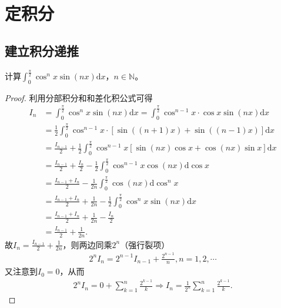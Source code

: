 \documentclass[../../main.tex]{subfiles}%
\begin{document}
\section{定积分}

\subsection{建立积分递推}

\begin{example}
计算\(\int_{0}^{\frac{\pi}{2}} \cos^{n}x\sin(nx)\mathrm{d}x\)，\(n \in \mathbb{N}\)。 
\end{example}
\begin{proof}

利用分部积分和和差化积公式可得
\begin{align*}
I_n&=\int_0^{\frac{\pi}{2}}\cos ^nx\sin(nx) \mathrm{d}x=\int_0^{\frac{\pi}{2}}\cos ^{n - 1}x\cdot\cos x\sin(nx) \mathrm{d}x\\
&=\frac{1}{2}\int_0^{\frac{\pi}{2}}\cos ^{n - 1}x\cdot[\sin((n + 1)x)+\sin((n - 1)x)] \mathrm{d}x\\
&=\frac{I_{n - 1}}{2}+\frac{1}{2}\int_0^{\frac{\pi}{2}}\cos ^{n - 1}x[\sin(nx)\cos x+\cos(nx)\sin x] \mathrm{d}x\\
&=\frac{I_{n - 1}}{2}+\frac{I_n}{2}-\frac{1}{2}\int_0^{\frac{\pi}{2}}\cos ^{n - 1}x\cos(nx) \mathrm{d}\cos x\\
&=\frac{I_{n - 1}+I_n}{2}-\frac{1}{2n}\int_0^{\frac{\pi}{2}}\cos(nx) \mathrm{d}\cos ^nx\\
&=\frac{I_{n - 1}+I_n}{2}+\frac{1}{2n}-\frac{1}{2}\int_0^{\frac{\pi}{2}}\cos ^nx\sin(nx) \mathrm{d}x\\
&=\frac{I_{n - 1}+I_n}{2}+\frac{1}{2n}-\frac{I_n}{2}\\
&=\frac{I_{n - 1}}{2}+\frac{1}{2n}.
\end{align*}
故\(I_n=\frac{I_{n - 1}}{2}+\frac{1}{2n}\)，则两边同乘\(2^n\)（强行裂项）
\begin{align*}
2^nI_n = 2^{n - 1}I_{n - 1}+\frac{2^{n - 1}}{n},n = 1,2,\cdots
\end{align*}
又注意到\(I_0 = 0\)，从而
\begin{align*}
2^nI_n = 0+\sum_{k = 1}^n\frac{2^{k - 1}}{k}\Rightarrow I_n=\frac{1}{2^n}\sum_{k = 1}^n\frac{2^{k - 1}}{k}.
\end{align*}

\end{proof}
\end{document}
